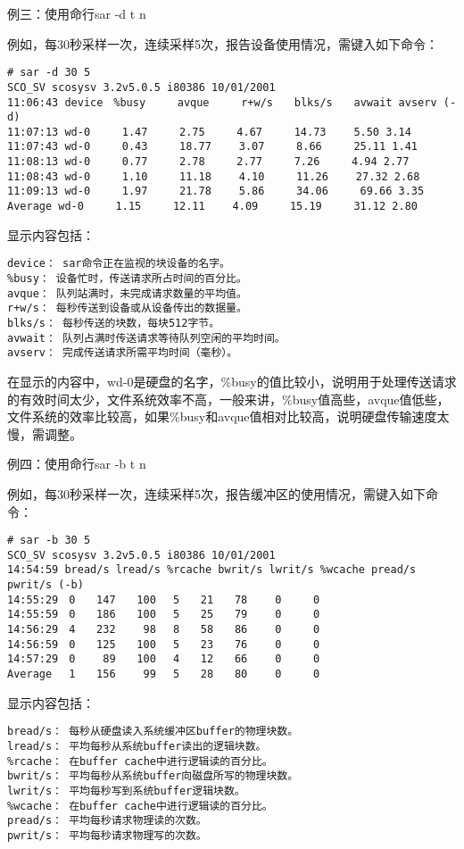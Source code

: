 例三：使用命行sar -d t n

例如，每30秒采样一次，连续采样5次，报告设备使用情况，需键入如下命令：
\begin{verbatim}
# sar -d 30 5
SCO_SV scosysv 3.2v5.0.5 i80386 10/01/2001
11:06:43 device　%busy　　　avque　　　r+w/s　　blks/s　　avwait avserv (-d)
11:07:13 wd-0　　　1.47　　　2.75　　　4.67　　　14.73　　 5.50 3.14
11:07:43 wd-0　　　0.43　　　18.77　　 3.07　　　8.66　　　25.11 1.41
11:08:13 wd-0　　　0.77　　　2.78　　　2.77　　　7.26　　　4.94 2.77
11:08:43 wd-0　　　1.10　　　11.18　　 4.10　　　11.26　　 27.32 2.68
11:09:13 wd-0　　　1.97　　　21.78　　 5.86　　　34.06　　　69.66 3.35
Average wd-0　　　1.15　　　12.11　　 4.09　　　15.19　　　31.12 2.80
\end{verbatim}

显示内容包括：
\begin{verbatim}
device： sar命令正在监视的块设备的名字。
%busy： 设备忙时，传送请求所占时间的百分比。
avque： 队列站满时，未完成请求数量的平均值。
r+w/s： 每秒传送到设备或从设备传出的数据量。
blks/s： 每秒传送的块数，每块512字节。
avwait： 队列占满时传送请求等待队列空闲的平均时间。
avserv： 完成传送请求所需平均时间（毫秒）。
\end{verbatim}

在显示的内容中，wd-0是硬盘的名字，\%busy的值比较小，说明用于处理传送请求
的有效时间太少，文件系统效率不高，一般来讲，\%busy值高些，avque值低些，
文件系统的效率比较高，如果\%busy和avque值相对比较高，说明硬盘传输速度太
慢，需调整。

例四：使用命行sar -b t n

例如，每30秒采样一次，连续采样5次，报告缓冲区的使用情况，需键入如下命令：
\begin{verbatim}
# sar -b 30 5
SCO_SV scosysv 3.2v5.0.5 i80386 10/01/2001
14:54:59 bread/s lread/s %rcache bwrit/s lwrit/s %wcache pread/s pwrit/s (-b)
14:55:29　0　　147　　100　 5　　21　　78　　 0　　　0
14:55:59　0　　186　　100　 5　　25　　79　　 0　　　0
14:56:29　4　　232 　　98　 8　　58　　86　　 0　　　0
14:56:59　0　　125　　100　 5　　23　　76　　 0　　　0
14:57:29　0　　 89　　100　 4　　12　　66　　 0　　　0
Average　 1　　156 　　99　 5　　28　　80　　 0　　　0
\end{verbatim}

显示内容包括：
\begin{verbatim}
bread/s： 每秒从硬盘读入系统缓冲区buffer的物理块数。
lread/s： 平均每秒从系统buffer读出的逻辑块数。
%rcache： 在buffer cache中进行逻辑读的百分比。
bwrit/s： 平均每秒从系统buffer向磁盘所写的物理块数。
lwrit/s： 平均每秒写到系统buffer逻辑块数。
%wcache： 在buffer cache中进行逻辑读的百分比。
pread/s： 平均每秒请求物理读的次数。
pwrit/s： 平均每秒请求物理写的次数。
\end{verbatim}

